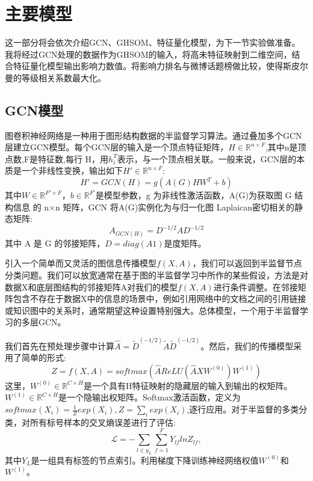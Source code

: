 
\chapter{主要模型}
\label{chap:model}
这一部分将会依次介绍GCN\cite{kipf2017semi}、GHSOM\cite{2018UserInfluenc}、特征量化模型，为下一节实验做准备。我将经过GCN处理的数据作为GHSOM的输入，将高未特征映射到二维空间，结合特征量化模型输出影响力数值。将影响力排名与微博话题榜做比较，使得斯皮尔曼的等级相关系数最大化。

\section{GCN模型}\label{sec:model1}

图卷积神经网络是一种用于图形结构数据的半监督学习算法。通过叠加多个GCN层建立GCN模型。每个GCN层的输入是一个顶点特征矩阵，$H\in \mathbb{R}^{n\times F}$,其中n是顶点数,F是特征数,每行 H，用$h_i^T$表示，与一个顶点相关联。一般来说，GCN层的本质是一个非线性变换，输出如下$H'\in \mathbb{R}^{n\times F}$:
\begin{equation}
H'=GCN(H)=g(A(G)HW^T+b)
\end{equation}
其中$W\in \mathbb{R}^{F'\times F}$，$𝑏 \in \mathbb{R}^{F'}$是模型参数，g 为非线性激活函数，A(G)为获取图 G 结构信息 的 n×n 矩阵，GCN 将A(G)实例化为与归一化图 Laplaican密切相关的静态矩阵:
\begin{equation}
A_{GCN(H)} = D^{-1/2}AD^{-1/2}
\end{equation}
其中 A 是 G 的邻接矩阵，$D=diag(A1)$是度矩阵。

引入一个简单而又灵活的图信息传播模型$f(X,A)$，我们可以返回到半监督节点分类问题。我们可以放宽通常在基于图的半监督学习中所作的某些假设，方法是对数据X和底层图结构的邻接矩阵A对我们的模型$f(X,A)$进行条件调整。在邻接矩阵包含不存在于数据X中的信息的场景中，例如引用网络中的文档之间的引用链接或知识图中的关系时，通常期望这种设置特别强大。总体模型，一个用于半监督学习的多层GCN。



我们首先在预处理步骤中计算$\widehat{A}=\widetilde{D}^{(-1/2)}\widetilde{A}\widetilde{D}^{(-1/2)}$。然后，我们的传播模型采用了简单的形式:
\begin{equation}
Z=f(X,A)=softmax(\widehat{A}ReLU(\widehat{A}XW^{(0)})W^{(1)})
\end{equation}
这里，$W^{(0)}\in \mathbb{R}^{C\times H}$是一个具有H特征映射的隐藏层的输入到输出的权矩阵。$W^{(1)}\in \mathbb{R}^{C\times H}$是一个隐输出权矩阵。Softmax激活函数，定义为$softmax(X_i)=\frac{1}{Z}exp(X_i),Z=\sum_{i}exp(X_i)$,逐行应用。对于半监督的多类分类，对所有标号样本的交叉熵误差进行了评估:
\begin{equation}
\mathcal{L}=-\sum_{l\in y_L}\sum_{f=1}^{F}Y_{lf}lnZ_{lf},
\end{equation}
其中$Y_L$是一组具有标签的节点索引。利用梯度下降训练神经网络权值$W^{(0)}$和$W^{(1)}$。


